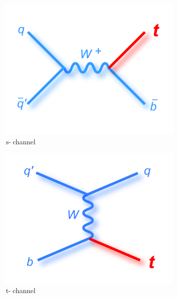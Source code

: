 \begin{figure}[h]
\begin{subfigure}{0.33\textwidth}
					 \includegraphics[width=\textwidth]{figures/feynman_tb_bold_ltblue_whitebkgd.png}
\caption{$\operatorname{s-}$channel}
\end{subfigure}%
\begin{subfigure}{0.33\textwidth}
					 \includegraphics[width=\textwidth]{figures/feynman_tq_bold_midblue.png}
\caption{$\operatorname{t-}$channel}
\end{subfigure}%
\begin{subfigure}{0.33\textwidth}

\end{subfigure}
\end{figure}
